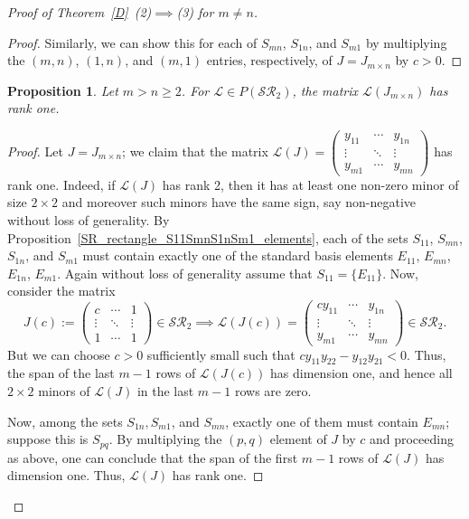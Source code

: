 \documentclass[11pt,reqno]{amsart}
\theoremstyle{plain}
\newtheorem{prop}[theorem]{Proposition}
\theoremstyle{definition}
\numberwithin{equation}{section}
\begin{document}
\begin{proof}[Proof of Theorem~\ref{D}~(2)$\implies$(3) for $m\neq n$]
\begin{proof}
		Similarly, we can show this for each of $S_{mn}$, $S_{1n}$, and $S_{m1}$ by multiplying the $(m,n)$, $(1,n)$, and $(m,1)$ entries, respectively, of $J=J_{m\times n}$ by $c>0$.
	\end{proof}
	\begin{prop}\label{Proposition_L(J)_rank_1}
		Let $m>n\geq2$. For $\mathcal{L}\in P(\mathcal{SR}_2)$, the matrix $\mathcal{L}(J_{m\times n})$ has rank one.
	\end{prop}
	\begin{proof}
		Let $J = J_{m\times n}$; we claim that the	matrix
		$\mathcal{L}(J)=\begin{pmatrix}
			y_{11} & \cdots & y_{1n} \\
			\vdots & \ddots & \vdots \\
			y_{m1} & \cdots & y_{mn}
		\end{pmatrix}$ has rank one. Indeed, if $\mathcal{L}(J)$ has rank 2, then it has at least one non-zero minor of size $2\times2$ and moreover such minors have the same sign, say non-negative without loss of generality. By Proposition~\ref{SR_rectangle_S11SmnS1nSm1_elements}, each of the sets $S_{11}$, $S_{mn}$, $S_{1n}$, and $S_{m1}$ must contain exactly one of the standard basis elements $E_{11}$, $E_{mn}$, $E_{1n}$, $E_{m1}$. Again without loss of generality assume that $S_{11} = \{E_{11}\}$. Now, consider the matrix
		\[J(c):=\begin{pmatrix}
			c & \cdots & 1 \\
			\vdots & \ddots & \vdots \\
			1 & \cdots & 1 
		\end{pmatrix}\in \mathcal{SR}_2 \implies \mathcal{L}(J(c))=\begin{pmatrix}
			cy_{11} & \cdots & y_{1n} \\
			\vdots & \ddots & \vdots  \\
			y_{m1} & \cdots & y_{mn}  
		\end{pmatrix}\in \mathcal{SR}_2.\] 
		But we can choose $c>0$ sufficiently small such that $cy_{11}y_{22}-y_{12}y_{21}<0$. Thus, the span of the last $m-1$ rows of $\mathcal{L}(J(c))$ has dimension one, and hence all $2\times2$ minors of $\mathcal{L}(J)$ in the last $m-1$ rows are zero.
		
		Now, among the sets $S_{1n}, S_{m1}$, and $S_{mn}$, exactly one of them must contain $E_{mn}$; suppose this is $S_{pq}$. By multiplying the $(p,q)$ element of $J$ by $c$ and proceeding as above, one can conclude that the span of the first $m-1$ rows of $\mathcal{L}(J)$ has dimension one. Thus, $\mathcal{L}(J)$ has rank one.
	\end{proof}
	

\end{proof}
\end{document}
